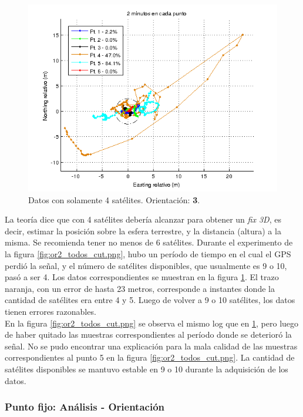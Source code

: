 \documentclass[main]{subfiles}
\begin{document}
\begin{figure}
\vspace{-25pt}

  \includegraphics[width=.55\textwidth]{./pics_gps/or2_todos_sat_mal.png}
  \vspace{-15pt}
  \caption{Datos con solamente 4 satélites. Orientación: \textbf{3}.}
  \label{fig:or2_todos_sat_mal.png}
\end{figure}
La teoría dice que con 4 satélites debería alcanzar para obtener un \textit{fix 3D}, es decir, estimar la posición sobre la esfera terrestre, y la distancia (altura) a la misma. Se recomienda tener no menos de 6 sat\'elites. Durante el experimento de la figura \ref{fig:or2_todos_cut.png}, hubo un per\'iodo de tiempo en el cual el GPS perdió la se\~nal, y el número de satélites disponibles, que usualmente es 9 o 10, pasó a ser 4. Los datos correspondientes se muestran en la figura \ref{fig:or2_todos_sat_mal.png}. El trazo naranja, con un error de hasta 23 metros, corresponde a instantes donde la cantidad de satélites era entre 4 y 5. Luego de volver a 9 o 10 satélites, los datos tienen errores razonables.\\



En la figura \ref{fig:or2_todos_cut.png} se observa el mismo log que en \ref{fig:or2_todos_sat_mal.png}, pero luego de haber quitado las muestras correspondientes al período donde se deterioró la se\~nal. No se pudo encontrar una explicación para la mala calidad de las muestras correspondientes al punto 5 en la figura \ref{fig:or2_todos_cut.png}. La cantidad de satélites disponibles se mantuvo estable en 9 o 10 durante la adquisición de los datos.

\subsubsection{Punto fijo: Análisis - \textbf{Orientación}}
\label{sec:gps-orientacion}
\end{document}
